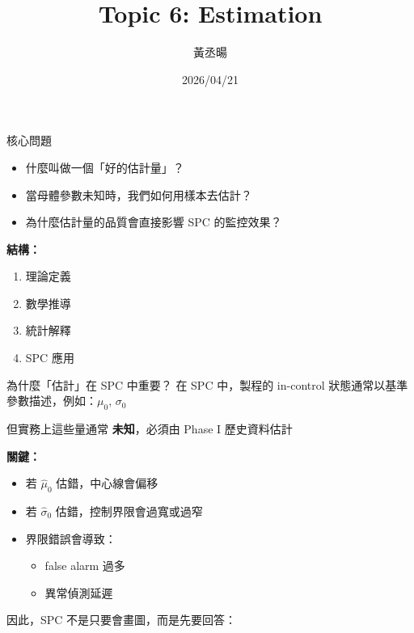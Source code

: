 \documentclass[aspectratio=169,12pt]{beamer}
\title{Topic 6: Estimation}
\author{黃丞暘}
\institute{統計專論 (III) 期中報告}
\date{2026/04/21}
\begin{document}
\begin{frame}
    \titlepage
\end{frame}

\begin{frame}{核心問題}
    \vspace{0.5em}
    \begin{itemize}
        \item 什麼叫做一個「好的估計量」？
        \item 當母體參數未知時，我們如何用樣本去估計？
        \item 為什麼估計量的品質會直接影響 SPC 的監控效果？
    \end{itemize}
    \vspace{0.8em}
    \textbf{結構：}
    \begin{enumerate}
        \item 理論定義
        \item 數學推導
        \item 統計解釋
        \item SPC 應用
    \end{enumerate}
\end{frame}

\begin{frame}{為什麼「估計」在 SPC 中重要？}
    在 SPC 中，製程的 in-control 狀態通常以基準參數描述，例如：$\mu_0,\, \sigma_0$

    \vspace{0.8em}
    但實務上這些量通常 \textbf{未知}，必須由 Phase I 歷史資料估計

    \vspace{0.8em}
    \textbf{關鍵：}
        \begin{itemize}
            \item 若 $\hat{\mu}_0$ 估錯，中心線會偏移
            \item 若 $\hat{\sigma}_0$ 估錯，控制界限會過寬或過窄
            \item 界限錯誤會導致：
            \begin{itemize}
                \item false alarm 過多
                \item 異常偵測延遲
            \end{itemize}
        \end{itemize}

    因此，SPC 不是只要會畫圖，而是先要回答：

\end{frame}
\end{document}
